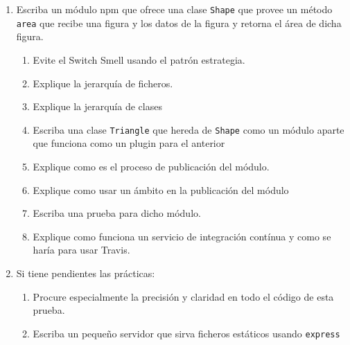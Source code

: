 \begin{enumerate}
\def\labelenumi{\arabic{enumi}.}
\itemsep1pt\parskip0pt
\item
  Escriba un módulo npm que ofrece una clase \texttt{Shape} que provee
  un método \texttt{area} que recibe una figura y los datos de la figura
  y retorna el área de dicha figura.

  \begin{enumerate}
  \def\labelenumii{\arabic{enumii}.}
  \itemsep1pt\parskip0pt
  \item
    Evite el Switch Smell usando el patrón estrategia.
  \item
    Explique la jerarquía de ficheros.
  \item
    Explique la jerarquía de clases
  \item
    Escriba una clase \texttt{Triangle} que hereda de \texttt{Shape}
    como un módulo aparte que funciona como un plugin para el anterior
  \item
    Explique como es el proceso de publicación del módulo.
  \item
    Explique como usar un ámbito en la publicación del módulo
  \item
    Escriba una prueba para dicho módulo.
  \item
    Explique como funciona un servicio de integración contínua y como se
    haría para usar Travis.
  \end{enumerate}
\item
  Si tiene pendientes las prácticas:

  \begin{enumerate}
  \def\labelenumii{\arabic{enumii}.}
  \itemsep1pt\parskip0pt
  \item
    Procure especialmente la precisión y claridad en todo el código de
    esta prueba.
  \item
    Escriba un pequeño servidor que sirva ficheros estáticos usando
    \texttt{express}
  \end{enumerate}
\end{enumerate}
